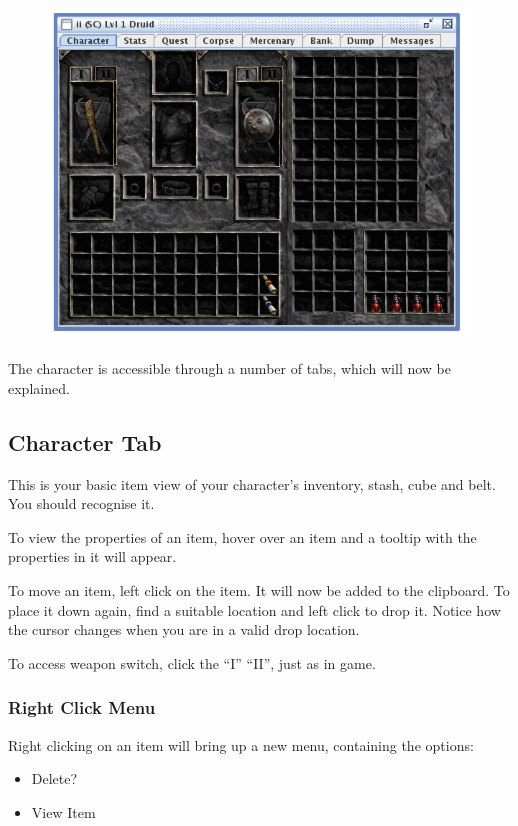 \documentclass[a4paper,10pt]{article}
\begin{document}
\begin{figure}[htp]
\centering
 \includegraphics[width=140mm]{char.png}
\end{figure}

The character is accessible through a number of tabs, which will now be explained.

\subsection{Character Tab}

This is your basic item view of your character's inventory, stash, cube and belt. You should recognise it. 

To view the properties of an item, hover over an item and a tooltip with the properties in it will appear.

To move an item, left click on the item. It will now be added to the clipboard. To place it down again, find a suitable location and left click to drop it. Notice how the cursor changes when you are in a valid drop location.

To access weapon switch, click the ``I'' ``II'', just as in game.

\subsubsection{Right Click Menu}

Right clicking on an item will bring up a new menu, containing the options:

\begin{itemize}
 \item Delete?
\item View Item
\end{itemize}
\end{document}
